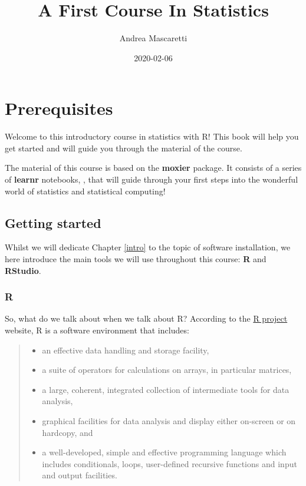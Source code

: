 \documentclass[
]{book}
\title{A First Course In Statistics}
\author{Andrea Mascaretti}
\date{2020-02-06}
\providecommand{\tightlist}{%
  \setlength{\itemsep}{0pt}\setlength{\parskip}{0pt}}
\begin{document}
\maketitle

{
\setcounter{tocdepth}{1}
\tableofcontents
}
\hypertarget{prerequisites}{%
\chapter{Prerequisites}\label{prerequisites}}

Welcome to this introductory course in statistics with R!
This book will help you get started and will guide you through the material of the course.

The material of this course is based on the \textbf{moxier} package.
It consists of a series of \textbf{learnr} notebooks, \citep{R-learnr}, that will guide through your first steps into the wonderful world of statistics and statistical computing!

\hypertarget{getting-started}{%
\section{Getting started}\label{getting-started}}

Whilst we will dedicate Chapter \ref{intro} to the topic of software installation, we here introduce the main tools we will use throughout this course: \textbf{R} and \textbf{RStudio}.

\hypertarget{r}{%
\subsection{R}\label{r}}

So, what do we talk about when we talk about R? According to the \href{https://www.r-project.org/about.html}{R project} website, R is a software environment that includes:

\begin{quote}
\begin{itemize}
\tightlist
\item
  an effective data handling and storage facility,
\item
  a suite of operators for calculations on arrays, in particular matrices,
\item
  a large, coherent, integrated collection of intermediate tools for data analysis,
\item
  graphical facilities for data analysis and display either on-screen or on hardcopy, and
\item
  a well-developed, simple and effective programming language which includes conditionals, loops, user-defined recursive functions and input and output facilities.
\end{itemize}
\end{quote}
\end{document}
